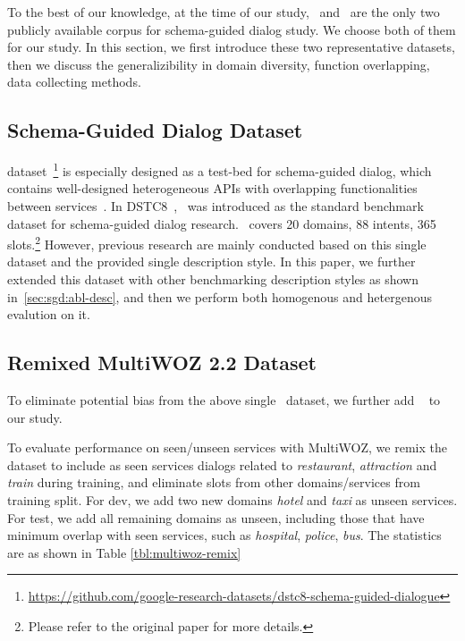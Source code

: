 To the best of our knowledge, at the time of our study, \sgdst~and
\multiwoz~are the only two publicly available corpus for schema-guided
dialog study. We choose both of them for our study. In this section,
we first introduce these two representative datasets, then we discuss
the generalizibility in domain diversity, function overlapping, data
collecting methods.

\subsection{Schema-Guided Dialog Dataset}
\label{ssec:sgd:schema-dataset}
\sgdst
dataset~\footnote{\url{https://github.com/google-research-datasets/dstc8-schema-guided-dialogue}}
is especially designed as a test-bed for schema-guided dialog, which
contains well-designed heterogeneous APIs with overlapping
functionalities between services~\cite{rastogi2019towards}. In
DSTC8~\cite{rastogi2020schema}, \sgdst~was introduced as the standard
benchmark dataset for schema-guided dialog research. \sgdst~covers 20
domains, 88 intents, 365 slots.\footnote{Please refer to the original
  paper for more details.} However, previous research are mainly
conducted based on this single dataset and the provided single
description style. In this paper, we further extended this dataset
with other benchmarking description styles as shown in~\autoref{sec:sgd:abl-desc}, and then we perform both homogenous and
hetergenous evalution on it.

\subsection{Remixed MultiWOZ 2.2 Dataset}
\label{ssec:sgd:multiwoz-dataset}

To eliminate potential bias from the above single \sgdst~dataset, we
further add \multiwoz~\cite{zang-etal-2020-multiwoz} to our study.

To evaluate performance on seen/unseen services with MultiWOZ, we
remix the \multiwoz dataset to include as seen services dialogs
related to \textit{restaurant}, \textit{attraction} and \textit{train}
during training, and eliminate slots from other domains/services from
training split.  For dev, we add two new domains {\it hotel} and {\it
  taxi} as unseen services. For test, we add all remaining domains as
unseen, including those that have minimum overlap with seen services,
such as {\it hospital}, {\it police}, {\it bus}. The statistics are as
shown in Table \ref{tbl:multiwoz-remix}

